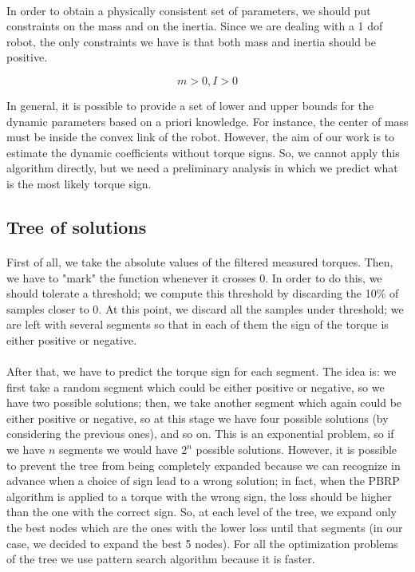 \documentclass{article}
\begin{document}
\paragraph{}In order to obtain a physically consistent set of parameters, we should put constraints on the mass and on the inertia. Since we are dealing with a 1 dof robot, the only constraints we have is that both mass and inertia should be positive.

\[m > 0, I > 0\]

In general, it is possible to provide a set of lower and upper bounds for the dynamic parameters based on a priori knowledge. For instance, the center of mass must be inside the convex link of the robot. However, the aim of our work is to estimate the dynamic coefficients without torque signs. So, we cannot apply this algorithm directly, but we need a preliminary analysis in which we predict what is the most likely torque sign.

\subsection{Tree of solutions}
\paragraph{}First of all, we take the absolute values of the filtered measured torques. Then, we have to "mark" the function whenever it crosses 0. In order to do this, we should tolerate a threshold; we compute this threshold by discarding the 10\% of samples closer to 0. At this point, we discard all the samples under threshold; we are left with several segments so that in each of them the sign of the torque is either positive or negative.
\paragraph{}After that, we have to predict the torque sign for each segment. The idea is: we first take a random segment which could be either positive or negative, so we have two possible solutions; then, we take another segment which again could be either positive or negative, so at this stage we have four possible solutions (by considering the previous ones), and so on. This is an exponential problem, so if we have $n$ segments we would have $2^n$ possible solutions. However, it is possible to prevent the tree from being completely expanded because we can recognize in advance when a choice of sign lead to a wrong solution; in fact, when the PBRP algorithm is applied to a torque with the wrong sign, the loss should be higher than the one with the correct sign. So, at each level of the tree, we expand only the best nodes which are the ones with the lower loss until that segments (in our case, we decided to expand the best 5 nodes). For all the optimization problems of the tree we use pattern search algorithm because it is faster.
\end{document}
